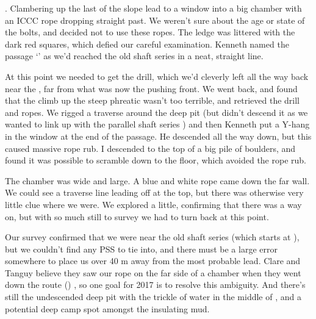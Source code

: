 . Clambering up the last of the slope lead to a window into a big chamber with an ICCC rope dropping straight past. We weren't sure about the age or state of the bolts, and decided not to use these ropes. The ledge was littered with the dark red squares, which defied our careful examination. Kenneth named the passage `' as we'd reached the old shaft series in a neat, straight line.
 
At this point we needed to get the drill, which we'd cleverly left all the way back near the , far from what was now the pushing front. We went back, and found that the climb up the steep phreatic wasn't too terrible, and retrieved the drill and ropes. We rigged a traverse around the deep pit (but didn't descend it as we wanted to link up with the parallel shaft series ) and then Kenneth put a Y-hang in the window at the end of the passage. He descended all the way down, but this caused massive rope rub. I descended to the top of a big pile of boulders, and found it was possible to scramble down to the floor, which avoided the rope rub.
 
The chamber was wide and large. A blue and white rope came down the far wall. We could see a traverse line leading off at the top, but there was otherwise very little clue where we were. We explored a little, confirming that there was a way on, but with so much still to survey we had to turn back at this point.
 
Our survey confirmed that we were near the old shaft series (which starts at ), but we couldn't find any PSS to tie into, and there must be a large error somewhere to place us over 40 m away from the most probable lead. Clare and Tanguy believe they saw our rope on the far side of a chamber when they went down the  route () , so one goal for 2017 is to resolve this ambiguity. And there's still the undescended deep pit with the trickle of water in the middle of , and a potential deep camp spot amongst the insulating mud.
 
